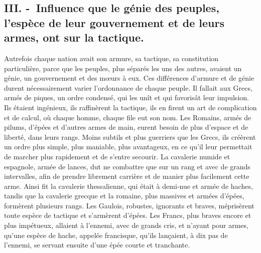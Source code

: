 \documentclass[french,twoside]{book} %
\begin{document}
\subsection[{III. - Influence que le génie des peuples, l’espèce de leur gouvernement et de leurs armes, ont sur la tactique.}]{III. - Influence que le génie des peuples, l’espèce de leur gouvernement et de leurs armes, ont sur la tactique.}
\noindent Autrefois chaque nation avait son armure, sa tactique, sa constitution particulière, parce que les peuples, plus séparés les uns des autres, avaient un génie, un gouvernement et des mœurs à eux. Ces différences d’armure et de génie durent nécessairement varier l’ordonnance de chaque peuple. Il fallait aux Grecs, armés de piques, un ordre condensé, qui les unît et qui favorisât leur impulsion. Ils étaient ingénieux, ils raffinèrent la tactique, ils en firent un art de complication et de calcul, où chaque homme, chaque file eut son nom. Les Romains, armés de pilums, d’épées et d’autres armes de main, eurent besoin de plus d’espace et de liberté, dans leurs rangs. Moins subtils et plus guerriers que les Grecs, ils créèrent un ordre plus simple, plus maniable, plus avantageux, en ce qu’il leur permettait de marcher plus rapidement et de s’entre secourir. La cavalerie numide et espagnole, armée de lances, dut ne combattre que sur un rang et avec de grands intervalles, afin de prendre librement carrière et de manier plus facilement cette arme. Ainsi fit la cavalerie thessalienne, qui était à demi-nue et armée de haches, tandis que la cavalerie grecque et la romaine, plus massives et armées d’épées, formèrent plusieurs rangs. Les Gaulois, robustes, ignorants et braves, méprisèrent toute espèce de tactique et s’armèrent d’épées. Les Francs, plus braves encore et plus impétueux, allaient à l’ennemi, avec de grands cris, et n’ayant pour armes, qu’une espèce de hache, appelée francisque, qu’ils lançaient, à dix pas de l’ennemi, se servant ensuite d’une épée courte et tranchante.\par
\end{document}
